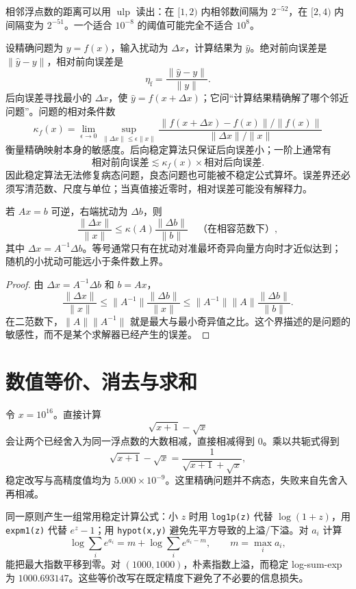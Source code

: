 相邻浮点数的距离可以用 $\operatorname{ulp}$ 读出：在 $[1,2)$ 内相邻数间隔为 $2^{-52}$，在 $[2,4)$ 内间隔变为 $2^{-51}$。一个适合 $10^{-8}$ 的阈值可能完全不适合 $10^8$。


设精确问题为 $y=f(x)$，输入扰动为 $\Delta x$，计算结果为 $\widehat y$。绝对前向误差是 $\|\widehat y-y\|$，相对前向误差是
\[
  \eta_{\mathrm f}=\frac{\|\widehat y-y\|}{\|y\|}.
\]
后向误差寻找最小的 $\Delta x$，使 $\widehat y=f(x+\Delta x)$；它问“计算结果精确解了哪个邻近问题”。问题的相对条件数
\[
  \kappa_f(x)=\lim_{\epsilon\to0}\sup_{\|\Delta x\|\le\epsilon\|x\|}
  \frac{\|f(x+\Delta x)-f(x)\|/\|f(x)\|}{\|\Delta x\|/\|x\|}
\]
衡量精确映射本身的敏感度。后向稳定算法只保证后向误差小；一阶上通常有
\[
  \text{相对前向误差}\lesssim \kappa_f(x)\times\text{相对后向误差}.
\]
因此稳定算法无法修复病态问题，良态问题也可能被不稳定公式算坏。误差界还必须写清范数、尺度与单位；当真值接近零时，相对误差可能没有解释力。

\begin{proposition}[线性系统的条件数放大]
若 $Ax=b$ 可逆，右端扰动为 $\Delta b$，则
\[
  \frac{\|\Delta x\|}{\|x\|}
  \le \kappa(A)\frac{\|\Delta b\|}{\|b\|}
  \quad\text{（在相容范数下）},
\]
其中 $\Delta x=A^{-1}\Delta b$。等号通常只有在扰动对准最坏奇异向量方向时才近似达到；随机的小扰动可能远小于条件数上界。
\end{proposition}
\begin{proof}
由 $\Delta x=A^{-1}\Delta b$ 和 $b=Ax$，
\[
 \frac{\|\Delta x\|}{\|x\|}
 \le\|A^{-1}\|\frac{\|\Delta b\|}{\|x\|}
 \le\|A^{-1}\|\|A\|\frac{\|\Delta b\|}{\|b\|}.
\]
在二范数下，$\|A\|\|A^{-1}\|$ 就是最大与最小奇异值之比。这个界描述的是问题的敏感性，而不是某个求解器已经产生的误差。
\end{proof}

\section{数值等价、消去与求和}

令 $x=10^{16}$。直接计算
\[
  \sqrt{x+1}-\sqrt{x}
\]
会让两个已经舍入为同一浮点数的大数相减，直接相减得到 $0$。乘以共轭式得到
\[
  \sqrt{x+1}-\sqrt{x}
  =\frac{1}{\sqrt{x+1}+\sqrt{x}},
\]
稳定改写与高精度值均为 $5.000\times10^{-9}$。这里精确问题并不病态，失败来自先舍入再相减。



同一原则产生一组常用稳定计算公式：小 $z$ 时用 \texttt{log1p(z)} 代替 $\log(1+z)$，用 \texttt{expm1(z)} 代替 $e^z-1$；用 \texttt{hypot(x,y)} 避免先平方导致的上溢/下溢。对 $a_i$ 计算
\[
  \log\sum_i e^{a_i}=m+\log\sum_i e^{a_i-m},\qquad m=\max_i a_i,
\]
能把最大指数平移到零。对 $(1000,1000)$，朴素指数上溢，而稳定 log-sum-exp 为 $1000.693147$。这些等价改写在既定精度下避免了不必要的信息损失。

